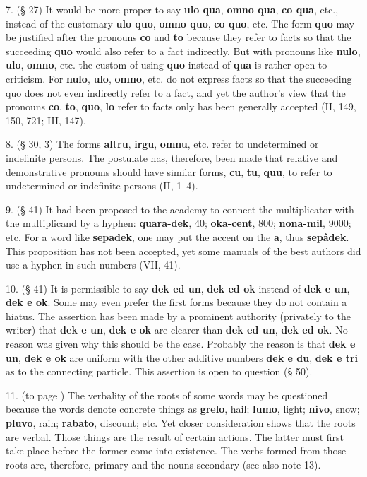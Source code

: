 7. (§ 27) It would be more proper to say \textbf{ulo qua}, \textbf{omno qua}, \textbf{co qua}, etc., instead of the customary \textbf{ulo quo}, \textbf{omno quo}, \textbf{co quo}, etc. The form \textbf{quo} may be justified after the pronouns \textbf{co} and \textbf{to} because they refer to facts so that the succeeding \textbf{quo} would also refer to a fact indirectly. But with pronouns like \textbf{nulo}, \textbf{ulo}, \textbf{omno}, etc. the custom of using \textbf{quo} instead of \textbf{qua} is rather open to criticism. For \textbf{nulo}, \textbf{ulo}, \textbf{omno}, etc. do not express facts so that the succeeding quo does not even indirectly refer to a fact, and yet the author's view that the pronouns \textbf{co}, \textbf{to}, \textbf{quo}, \textbf{lo} refer to facts only has been generally accepted (II, 149, 150, 721; III, 147).

8. (§ 30, 3) The forms \textbf{altru}, \textbf{irgu}, \textbf{omnu}, etc. refer to undetermined or indefinite persons. The postulate has, therefore, been made that relative and demonstrative pronouns should have similar forms, \textbf{cu}, \textbf{tu}, \textbf{quu}, to refer to undetermined or indefinite persons (II, 1‒4).

9. (§ 41) It had been proposed to the academy to connect the multiplicator with the multiplicand by a hyphen: \textbf{quara-dek}, 40; \textbf{oka-cent}, 800; \textbf{nona-mil}, 9000; etc. For a word like \textbf{sepadek}, one may put the accent on the \textbf{a}, thus \textbf{sepâdek}. This proposition has not been accepted, yet some manuals of the best authors did use a hyphen in such numbers (VII, 41).

10. (§ 41) It is permissible to say \textbf{dek ed un}, \textbf{dek ed ok} instead of \textbf{dek e un}, \textbf{dek e ok}. Some may even prefer the first forms because they do not contain a hiatus. The assertion has been made by a prominent authority (privately to the writer) that \textbf{dek e un}, \textbf{dek e ok} are clearer than \textbf{dek ed un}, \textbf{dek ed ok}. No reason was given why this should be the case. Probably the reason is that \textbf{dek e un}, \textbf{dek e ok} are uniform with the other additive numbers \textbf{dek e du}, \textbf{dek e tri} as to the connecting particle. This assertion is open to question (§ 50).

11. (to page \pageref{parts}) The verbality of the roots of some words may be questioned because the words denote concrete things as \textbf{grelo}, hail; \textbf{lumo}, light; \textbf{nivo}, snow; \textbf{pluvo}, rain; \textbf{rabato}, discount; etc. Yet closer consideration shows that the roots are verbal. Those things are the result of certain actions. The latter must first take place before the former come into existence. The verbs formed from those roots are, therefore, primary and the nouns secondary (see also note 13).

